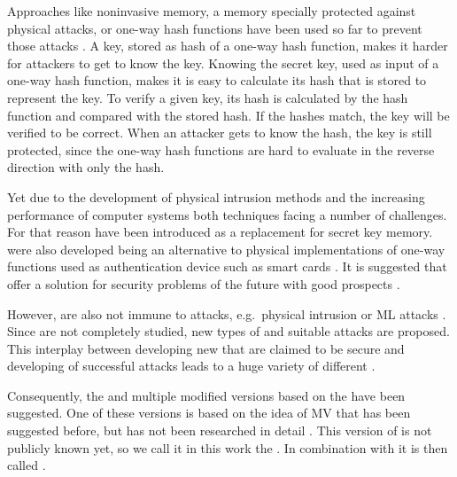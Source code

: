 Approaches like noninvasive memory, a memory specially protected against physical attacks, or one-way hash functions have been used so far to prevent those attacks \cite{Pappu2001PhysicalFunctions}. %
A key, stored as hash of a one-way hash function, makes it harder for attackers to get to know the key. 
Knowing the secret key, used as input of a one-way hash function, makes it is easy to calculate its hash that is stored to represent the key.
To verify a given key, its hash is calculated by the hash function and compared with the stored hash.
If the hashes match, the key will be verified to be correct.
When an attacker gets to know the hash, the key is still protected, since the one-way hash functions are hard to evaluate in the reverse direction with only the hash. %

Yet due to the development of physical intrusion methods and the increasing performance of computer systems both techniques facing a number of challenges.
For that reason \pufs have been introduced as a replacement for secret key memory.
\pufs were also developed being an alternative to physical implementations of one-way functions used as authentication device such as smart cards \cite{Pappu2001PhysicalFunctions}.
It is suggested that \pufs offer a solution for security problems of the future with good prospects \cite{Tajik2014PhysicalPUFs}.


However, \pufs are also not immune to attacks, e.g.\ physical intrusion or \acl{ML} attacks \cite{Tajik2014PhysicalPUFs,Ruhrmair2010ModelingFunctions,Becker2015ThePUFs,Helfmeier2014PhysicalFunctions}.
Since \pufs are not completely studied, new types of \pufs and suitable attacks are proposed. %
This interplay between developing new \pufs that are claimed to be secure and developing of successful attacks leads to a huge variety of different \pufs \cite{Ruhrmair2014PUFOverview}.

Consequently, the \apuf and multiple modified versions based on the \apuf have been suggested. %
One of these versions is based on the idea of \ac{MV} that has been suggested before, but has not been researched in detail \cite{Ruhrmair2013PUFData}.
This version of \apufs is not publicly known yet, so we call it in this work the \mpuf.
In combination with \xpufs it is then called \mxpufs.

